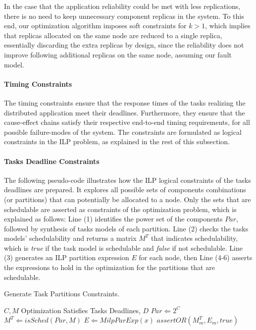 In the case that the application reliability could be met with less replications, there is no need to keep unnecessary component replicas in the system. To this end, our optimization algorithm imposes soft constraints for $k>1$, which implies that replicas allocated on the same node are reduced to a single replica, essentially discarding the extra replicas by design, since the reliability does not improve following additional replicas on the same node, assuming our fault model.

\paragraph{Timing Constraints}
The timing constraints ensure that the response times of the tasks realizing the distributed application meet their deadlines. Furthermore, they ensure that the cause-effect chains satisfy their respective end-to-end timing requirements, for all possible failure-modes of the system. The constraints are formulated as logical constraints in the ILP problem, as explained in the rest of this subsection.

\paragraph*{Tasks Deadline Constraints}
The following pseudo-code illustrates how the ILP logical constraints of the tasks deadlines are prepared. It explores all possible sets of components combinations (or partitions) that can potentially be allocated to a node. Only the sets that are schedulable are asserted as constraints of the optimization problem, which is explained as follows: Line (1) identifies the power set of the components $Par$, followed by synthesis of tasks models of each partition. Line (2) checks the tasks models' schedulability and returns a matrix $M^T$ that indicates schedulability, which is \textit{true} if the task model is schedulable and \textit{false} if not schedulable. Line (3) generates an ILP partition expression $E$ for each node, then Line (4-6) asserts the expressions to hold in the optimization for the partitions that are schedulable.
\begin{algorithm}
\caption{Generate Task Partitions Constraints.}\label{alg_partition}
\renewcommand{\algorithmicrequire}{\textbf{Input:}}
\begin{algorithmic}[1]
\Require $C,M$
\Ensure Optimization Satisfies Tasks Deadlines, $D$
\State $Par \Leftarrow 2^C$	
\State $M^T\Leftarrow isSched(Par, M)$
\State $E\Leftarrow MilpParExp(x)$
	\State $assertOR(M^T_m, E_m, true)$
\EndFor
\end{algorithmic}
\end{algorithm}

